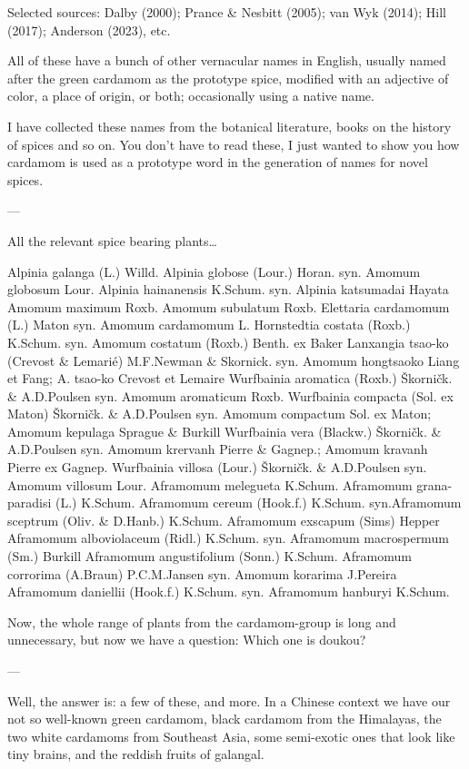 \documentclass[12pt]{article}
\begin{document}
Selected sources: Dalby (2000); Prance \& Nesbitt (2005); van Wyk (2014); Hill (2017); Anderson (2023), etc.  



All of these have a bunch of other vernacular names in English, usually named after the green cardamom as the prototype spice, modified with an adjective of color, a place of origin, or both; occasionally using a native name.

I have collected these names from the botanical literature, books on the history of spices and so on. You don’t have to read these, I just wanted to show you how cardamom is used as a prototype word in the generation of names for novel spices.

---

All the relevant spice bearing plants…

Alpinia galanga (L.) Willd. 
Alpinia globose (Lour.) Horan. syn. Amomum globosum Lour.
Alpinia hainanensis K.Schum. syn. Alpinia katsumadai Hayata
Amomum maximum Roxb.	
Amomum subulatum Roxb.	
Elettaria cardamomum (L.) Maton syn. Amomum cardamomum L.
Hornstedtia costata (Roxb.) K.Schum. syn. Amomum costatum (Roxb.) Benth. ex Baker
Lanxangia tsao-ko (Crevost \& Lemarié) M.F.Newman \& Skornick. syn. Amomum hongtsaoko Liang et Fang; A. tsao-ko Crevost et Lemaire
Wurfbainia aromatica (Roxb.) Škorničk. \& A.D.Poulsen syn. Amomum aromaticum Roxb.
Wurfbainia compacta (Sol. ex Maton) Škorničk. \& A.D.Poulsen syn. Amomum compactum Sol. ex Maton; Amomum kepulaga Sprague \& Burkill
Wurfbainia vera (Blackw.) Škorničk. \& A.D.Poulsen syn. Amomum krervanh Pierre \& Gagnep.; Amomum kravanh Pierre ex Gagnep.
Wurfbainia villosa (Lour.) Škorničk. \& A.D.Poulsen syn. Amomum villosum Lour.
Aframomum melegueta K.Schum.	Aframomum grana-paradisi (L.) K.Schum. 
Aframomum cereum (Hook.f.) K.Schum. syn.Aframomum sceptrum (Oliv. \& D.Hanb.) K.Schum.
Aframomum exscapum (Sims) Hepper	
Aframomum alboviolaceum (Ridl.) K.Schum. syn. Aframomum macrospermum (Sm.) Burkill
Aframomum angustifolium (Sonn.) K.Schum.	
Aframomum corrorima (A.Braun) P.C.M.Jansen	 syn. Amomum korarima J.Pereira
Aframomum daniellii	(Hook.f.) K.Schum. syn. Aframomum hanburyi K.Schum.

Now, the whole range of plants from the cardamom-group is long and unnecessary, but now we have a question: Which one is doukou?

---

Well, the answer is: a few of these, and more. In a Chinese context we have our not so well-known green cardamom, black cardamom from the Himalayas, the two white cardamoms from Southeast Asia, some semi-exotic ones that look like tiny brains, and the reddish fruits of galangal.
\end{document}
